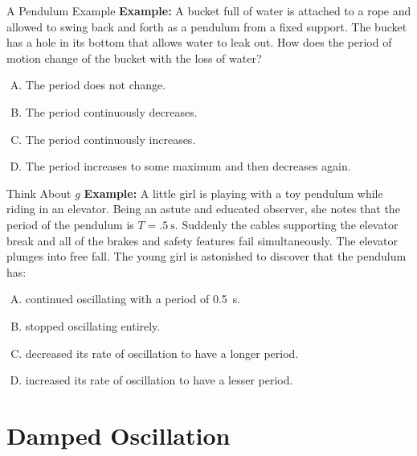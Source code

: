 \documentclass[12pt,compress,aspectratio=169]{beamer}
\begin{document}
\begin{frame}{A Pendulum Example}
  \textbf{Example:} A bucket full of water is attached to a rope and allowed
  to swing back and forth as a pendulum from a fixed support. The bucket has a
  hole in its bottom that allows water to leak out. How does the period of
  motion change of the bucket with the loss of water?
  \begin{enumerate}[(A)]
  \item The period does not change.
  \item The period continuously decreases.
  \item The period continuously increases.
  \item The period increases to some maximum and then decreases again.
  \end{enumerate}
\end{frame}



\begin{frame}{Think About $g$}
  \textbf{Example:} A little girl is playing with a toy pendulum while riding
  in an elevator. Being an astute and educated observer, she notes that the 
  period of the pendulum is $T=\SI{.5}\second$. Suddenly the cables
  supporting the elevator break and all  of the brakes and safety features fail
  simultaneously. The elevator plunges into free fall. The young girl is
  astonished to discover that the pendulum has:
  \begin{enumerate}[(A)]
  \item continued oscillating with a period of \SI{.5}\second.
  \item stopped oscillating entirely.
  \item decreased its rate of oscillation to have a longer period.
  \item increased its rate of oscillation to have a lesser period.
  \end{enumerate}
\end{frame}



\section{Damped Oscillation}
\end{document}
